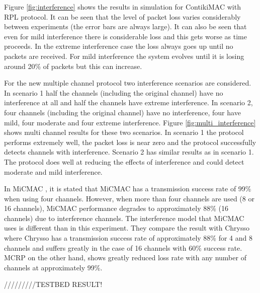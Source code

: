 Figure \ref{fig:interference} shows the results in simulation for ContikiMAC with RPL protocol. It can be seen that the level of packet loss varies considerably between experiments (the error bars are always large). It can also be seen that even for mild interference there is considerable loss and this gets worse as time proceeds. In the extreme interference case the loss always goes up until no packets are received. For mild interference the system evolves until it is losing around 20\% of packets but this can increase.

For the new multiple channel protocol two interference scenarios are considered.
In scenario 1 half the channels (including the original channel) have no
interference at all and half the channels have extreme interference.
In scenario 2, four channels (including the original channel) have no
interference, four have mild, four moderate and four extreme interference.
Figure \ref{fig:multi_interference} shows multi channel results for these
two scenarios.  In scenario 1 the protocol performs extremely well, the packet loss is near zero and the protocol successfully detects channels with interference.
Scenario 2 has similar results as in scenario 1. The protocol does well at reducing the effects of interference and could detect moderate and mild interference.

In MiCMAC \cite{micmac}, it is stated that MiCMAC has a transmission success rate of 99\% when using four channels. However, when more than four channels are used (8 or 16 channels), MiCMAC performance degrades to approximately 88\% (16 channels) due to interference channels. The interference model that MiCMAC uses is different than in this experiment. They compare the result with Chrysso where Chrysso has a transmission success rate of approximately 88\% for 4 and 8 channels and suffers greatly in the case of 16 channels with 60\% success rate.
MCRP on the other hand, shows greatly reduced loss rate with any number of channels at approximately 99\%.

/////////TESTBED RESULT!


